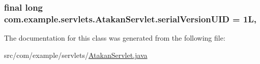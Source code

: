 \subsubsection[{serial\+Version\+U\+I\+D}]{\setlength{\rightskip}{0pt plus 5cm}final long com.\+example.\+servlets.\+Atakan\+Servlet.\+serial\+Version\+U\+I\+D = 1\+L\hspace{0.3cm}{\ttfamily [static]}, {\ttfamily [private]}}\label{classcom_1_1example_1_1servlets_1_1_atakan_servlet_a11981eeac794fddff011e967e18e28fb}


The documentation for this class was generated from the following file\+:\begin{DoxyCompactItemize}
\item 
src/com/example/servlets/\hyperlink{_atakan_servlet_8java}{Atakan\+Servlet.\+java}\end{DoxyCompactItemize}
